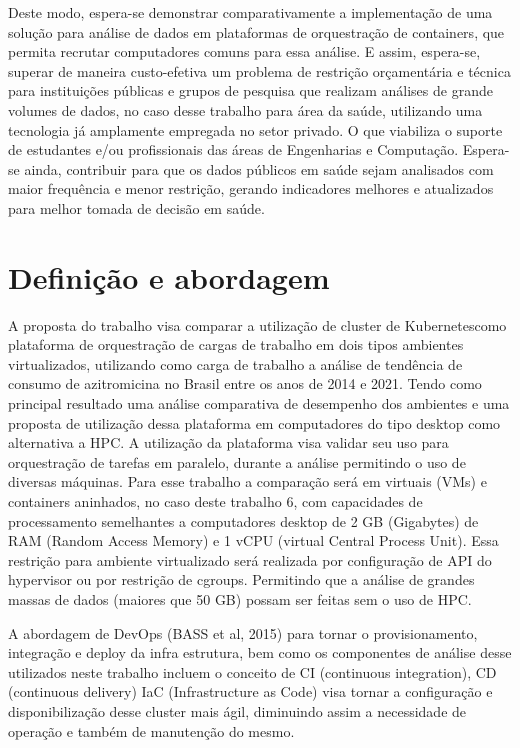 Deste modo, espera-se demonstrar comparativamente a implementação de uma solução para análise de dados em plataformas de orquestração de containers, que permita recrutar computadores comuns para essa análise. E assim, espera-se, superar de maneira custo-efetiva um problema de restrição orçamentária e técnica para instituições públicas e grupos de pesquisa que realizam análises de grande volumes de dados, no caso desse trabalho para área da saúde, utilizando uma tecnologia já amplamente empregada no setor privado. O que viabiliza o suporte de estudantes e/ou profissionais das áreas de Engenharias e Computação. Espera-se ainda, contribuir para que os dados públicos em saúde sejam analisados com  maior frequência e menor restrição, gerando indicadores melhores e atualizados para melhor tomada de decisão em saúde.

\section{Definição e abordagem}
\label{sec:abordagem}

A proposta do trabalho visa comparar a utilização de cluster de Kubernetes\textregistered como plataforma de orquestração de cargas de trabalho em dois tipos ambientes virtualizados, utilizando como carga de trabalho a análise de tendência de consumo de azitromicina no Brasil entre os anos de 2014 e 2021. Tendo como principal resultado uma análise comparativa de desempenho dos ambientes e uma proposta de utilização dessa plataforma em computadores do tipo desktop como alternativa a HPC.
A utilização da plataforma visa validar seu uso para orquestração de tarefas em paralelo, durante a análise permitindo o uso de diversas máquinas. Para esse trabalho a comparação será em virtuais (VMs) e containers aninhados, no caso deste trabalho 6, com capacidades de processamento semelhantes a computadores desktop de 2 GB (Gigabytes) de RAM (Random Access Memory) e 1 vCPU (virtual Central Process Unit). Essa restrição para ambiente virtualizado será realizada por configuração de API do hypervisor ou por restrição de cgroups. Permitindo que a análise de grandes massas de dados (maiores que 50 GB) possam ser feitas sem o uso de HPC.

A abordagem de DevOps (BASS et al, 2015) para tornar o provisionamento, integração e deploy da infra estrutura, bem como os componentes de análise desse utilizados neste trabalho incluem o conceito de CI (continuous integration), CD (continuous delivery)  IaC (Infrastructure as Code) visa tornar a configuração e disponibilização desse cluster mais ágil, diminuindo assim a necessidade de operação e também de manutenção do mesmo.

